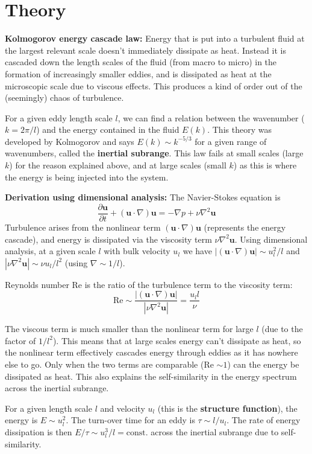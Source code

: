 \documentclass[12pt,letterpaper]{article}
\newcommand{\B}[1]{\mathbf{#1}}
\begin{document}
  \section*{Theory}
  \textbf{Kolmogorov energy cascade law: } Energy that is put into a turbulent fluid at the largest relevant scale doesn't immediately dissipate as heat. Instead it is cascaded down the length scales of the fluid (from macro to micro) in the formation of increasingly smaller eddies, and is dissipated as heat at the microscopic scale due to viscous effects. This produces a kind of order out of the (seemingly) chaos of turbulence.

  For a given eddy length scale $l$, we can find a relation between the wavenumber ($k=2\pi/l$) and the energy contained in the fluid $E(k)$. This theory was developed by Kolmogorov and says $E(k)\sim k^{-5/3}$ for a given range of wavenumbers, called the \textbf{inertial subrange}. This law fails at small scales (large $k$) for the reason explained above, and at large scales (small $k$) as this is where the energy is being injected into the system.

  \textbf{Derivation using dimensional analysis:} The Navier-Stokes equation is
  $$
    \frac{\partial \B{u}}{\partial t} + (\B{u}\cdot\nabla)\B{u} = -\nabla p + \nu \nabla^2\B{u}
  $$
  Turbulence arises from the nonlinear term $(\B{u}\cdot\nabla)\B{u}$ (represents the energy cascade), and energy is dissipated via the viscosity term $\nu \nabla^2\B{u}$. Using dimensional analysis, at a given scale $l$ with bulk velocity $u_l$ we have $|(\B{u}\cdot \nabla)\B{u}|\sim u^2_l/l$ and $|\nu \nabla^2 \B{u}|\sim \nu u_l / l^2$ (using $\nabla \sim 1/l$).

  Reynolds number Re is the ratio of the turbulence term to the viscosity term:
  $$
    \text{Re} \sim \frac{|(\B{u}\cdot \nabla)\B{u}|}{|\nu \nabla^2 \B{u}|} = \frac{u_l l}{\nu}
  $$

  The viscous term is much smaller than the nonlinear term for large $l$ (due to the factor of $1/l^2$). This means that at large scales energy can't dissipate as heat, so the nonlinear term effectively cascades energy through eddies as it has nowhere else to go. Only when the two terms are comparable (Re $\sim 1$) can the energy be dissipated as heat. This also explains the self-similarity in the energy spectrum across the inertial subrange.

  For a given length scale $l$ and velocity $u_l$ (this is the \textbf{structure function}), the energy is $E\sim u^2_l$. The turn-over time for an eddy is $\tau\sim l/u_l$. The rate of energy dissipation is then $E/\tau \sim u^3_l/l=\text{const.}$ across the inertial subrange due to self-similarity.
\end{document}
